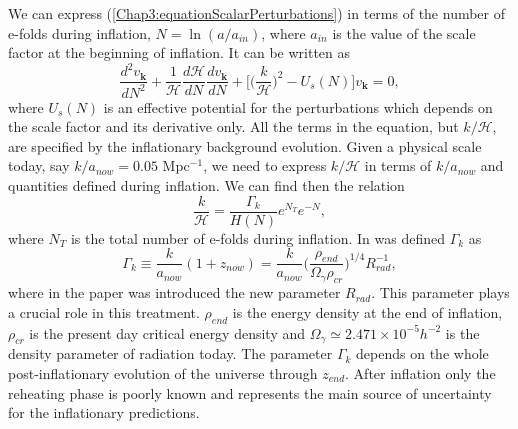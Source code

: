 \documentclass[11pt,a4paper,twoside]{book}
\begin{document}
We can express (\ref{Chap3:equationScalarPerturbations}) in terms of the number of e-folds during inflation, $ N=\ln (a/a_{in}) $, where $ a_{in} $ is the value of the scale factor at the beginning of inflation. It can be written as 
\begin{equation}
\label{Chap3:scalarPerturbation}
\frac{d^{2} v_{\textbf{k}}}{dN^{2}} + \frac{1}{\mathcal{H}}\frac{d\mathcal{H}}{dN}\frac{dv_{\textbf{k}}}{dN} + \Bigg[\Bigg(\frac{k}{\mathcal{H}}\Bigg)^{2}-U_{s}(N)\Bigg]v_{\textbf{k}}=0,
\end{equation}
where $ U_{s}(N) $ is an effective potential for the perturbations which depends on the scale factor and its derivative only. All the terms in the equation, but $ k/\mathcal{H} $, are specified by the inflationary background evolution. Given  a physical scale today, say $ k/a_{now}=0.05 $ Mpc$^{-1} $, we need to express $ k/\mathcal{H} $ in terms of $ k/a_{now} $ and quantities defined during inflation. We can find then the relation
\begin{equation}
\label{Chap3:kH}
\frac{k}{\mathcal{H}}=\frac{\Gamma_{k}}{H(N)}e^{N_{T}}e^{-N},
\end{equation}
where $ N_{T} $ is the total number of e-folds during inflation. In \cite{Chap3:Martin_Ringeval} was defined $\Gamma_{k}$ as
\begin{equation}
	\label{Chap3:Gammak}
	\Gamma_{k}\equiv \frac{k}{a_{now}}(1+z_{now}) = \frac{k}{a_{now}}\Bigg(\frac{\rho_{end}}{\Omega_{\gamma}\rho_{cr}}\Bigg)^{1/4}R^{-1}_{rad},
\end{equation}
where in the paper was introduced the new parameter $ R_{rad} $. This parameter plays a crucial role in this treatment. $\rho_{end}$ is the energy density at the end of inflation, $\rho_{cr}$ is the present day critical energy density and $\Omega_{\gamma} \simeq 2.471 \times 10^{-5} h^{-2}$ is the density parameter of radiation today.
The parameter $ \Gamma_{k} $ depends on the whole post-inflationary evolution of the universe through $ z_{end} $. After inflation only the reheating phase is poorly known and represents the main source of uncertainty for the inflationary predictions.
\end{document}
